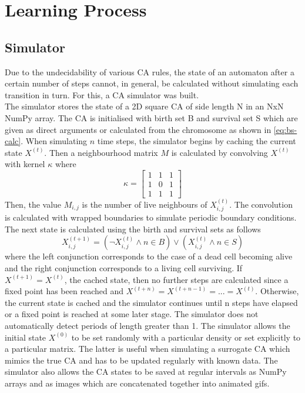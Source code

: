 \section{Learning Process}

\subsection{Simulator} \label{subsec:simulator}
Due to the undecidability of various CA rules, the state of an automaton after a certain number of steps cannot, in general, be calculated without simulating each transition in turn. For this, a CA simulator was built.\\

The simulator stores the state of a 2D square CA of side length N in an NxN NumPy array. The CA is initialised with birth set B and survival set S which are given as direct arguments or calculated from the chromosome as shown in \ref{eq:bs-calc}. When simulating $n$ time steps, the simulator begins by caching the current state $X^{(t)}$. Then a neighbourhood matrix $M$ is calculated by convolving $X^{(t)}$ with kernel $\kappa$ where
\[
    \kappa = \begin{bmatrix}
        1 & 1 & 1\\
        1 & 0 & 1\\
        1 & 1 & 1
        \end{bmatrix}    
\]
Then, the value $M_{i,j}$ is the number of live neighbours of $X^{(t)}_{i,j}$. The convolution is calculated with wrapped boundaries to simulate periodic boundary conditions. The next state is calculated using the birth and survival sets as follows
\[
    X^{(t+1)}_{i,j}= (\lnot X^{(t)}_{i,j} \land n \in B) \lor (X^{(t)}_{i,j} \land n \in S)
\]
where the left conjunction corresponds to the case of a dead cell becoming alive and the right conjunction corresponds to a living cell surviving. If $X^{(t+1)} = X^{(t)}$, the cached state, then no further steps are calculated since a fixed point has been reached and $X^{(t + n)} = X^{(t + n - 1)} = ... = X^{(t)}$. Otherwise, the current state is cached and the simulator continues until n steps have elapsed or a fixed point is reached at some later stage. The simulator does not automatically detect periods of length greater than 1. The simulator allows the initial state $X^{(0)}$ to be set randomly with a particular density or set explicitly to a particular matrix. The latter is useful when simulating a surrogate CA which mimics the true CA and has to be updated regularly with known data. The simulator also allows the CA states to be saved at regular intervals as NumPy arrays and as images which are concatenated together into animated gifs.\\

